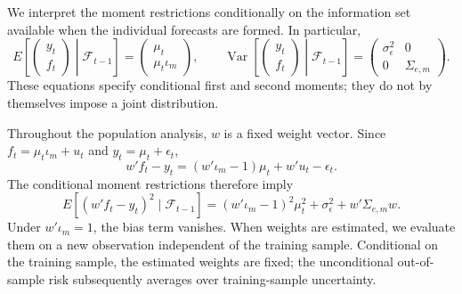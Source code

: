 

We interpret the moment restrictions conditionally on the information set
available when the individual forecasts are formed. In particular,
\[
 E\!\left[
 \begin{pmatrix}y_t\\f_t\end{pmatrix}
 \middle|\mathcal F_{t-1}
 \right]
 =
 \begin{pmatrix}\mu_t\\\mu_t\iota_m\end{pmatrix},
 \qquad
 \operatorname{Var}\!\left[
 \begin{pmatrix}y_t\\f_t\end{pmatrix}
 \middle|\mathcal F_{t-1}
 \right]
 =
 \begin{pmatrix}
 \sigma_\epsilon^2&0\\
 0&\Sigma_{e,m}
 \end{pmatrix}.
\]
These equations specify conditional first and second moments; they do not by
themselves impose a joint distribution.


Throughout the population analysis, $w$ is a fixed weight vector. Since
$f_t=\mu_t\iota_m+u_t$ and $y_t=\mu_t+\epsilon_t$,
\[
 w'f_t-y_t=(w'\iota_m-1)\mu_t+w'u_t-\epsilon_t.
\]
The conditional moment restrictions therefore imply
\[
 E[(w'f_t-y_t)^2\mid\mathcal F_{t-1}]
 =
 (w'\iota_m-1)^2\mu_t^2+\sigma_\epsilon^2+w'\Sigma_{e,m}w.
\]
Under $w'\iota_m=1$, the bias term vanishes. When weights are estimated, we
evaluate them on a new observation independent of the training sample.
Conditional on the training sample, the estimated weights are fixed; the
unconditional out-of-sample risk subsequently averages over training-sample
uncertainty.


